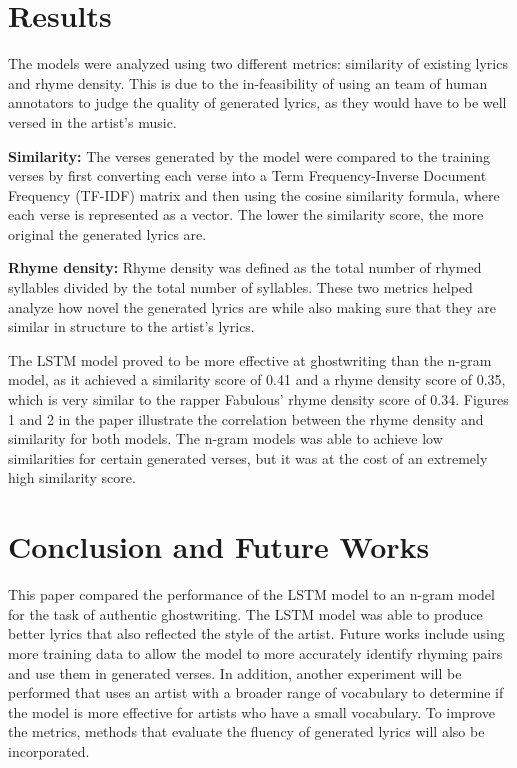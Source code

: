\documentclass{article}
\begin{document}
\section{Results}
The models were analyzed using two different metrics: similarity of existing lyrics and rhyme density. This is due to the in-feasibility of using an team of human annotators to judge the quality of generated lyrics, as they would have to be well versed in the artist's music. 

\textbf{Similarity:} The verses generated by the model were compared to the training verses by first converting each verse into a Term Frequency-Inverse Document Frequency (TF-IDF) matrix and then using the cosine similarity formula, where each verse is represented as a vector. The lower the similarity score, the more original the generated lyrics are. 

\textbf{Rhyme density:} Rhyme density was defined as the total number of rhymed syllables divided by the total number of syllables. These two metrics helped analyze how novel the generated lyrics are while also making sure that they are similar in structure to the artist's lyrics. 

The LSTM model proved to be more effective at ghostwriting than the n-gram model, as it achieved a similarity score of 0.41 and a rhyme density score of 0.35, which is very similar to the rapper Fabulous' rhyme density score of 0.34. Figures 1 and 2 in the paper illustrate the correlation between the rhyme density and similarity for both models. The n-gram models was able to achieve low similarities for certain generated verses, but it was at the cost of an extremely high similarity score.

\section{Conclusion and Future Works}
This paper compared the performance of the LSTM model to an n-gram model for the task of authentic ghostwriting. The LSTM model was able to produce better lyrics that also reflected the style of the artist. Future works include using more training data to allow the model to more accurately identify rhyming pairs and use them in generated verses. In addition, another experiment will be performed that uses an artist with a broader range of vocabulary to determine if the model is more effective for artists who have a small vocabulary. To improve the metrics, methods that evaluate the fluency of generated lyrics will also be incorporated. 
\end{document}
